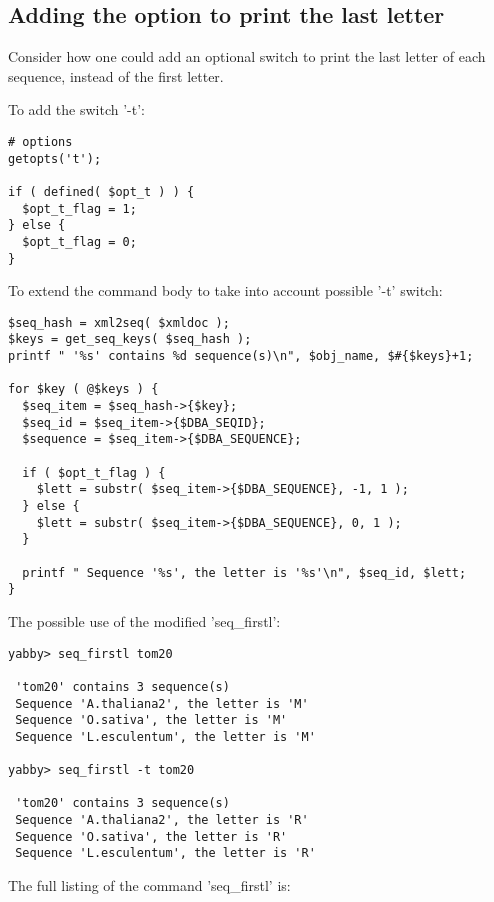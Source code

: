 \subsection{Adding the option to print the last letter}

Consider how one could add an optional switch to print the last
letter of each sequence, instead of the first letter.

To add the switch '-t':

\begin{verbatim}
# options
getopts('t');

if ( defined( $opt_t ) ) {
  $opt_t_flag = 1;
} else {
  $opt_t_flag = 0;
}
\end{verbatim}

To extend the command body to take into account possible '-t'
switch: 

\begin{verbatim}
$seq_hash = xml2seq( $xmldoc );
$keys = get_seq_keys( $seq_hash );
printf " '%s' contains %d sequence(s)\n", $obj_name, $#{$keys}+1;

for $key ( @$keys ) {
  $seq_item = $seq_hash->{$key};
  $seq_id = $seq_item->{$DBA_SEQID};
  $sequence = $seq_item->{$DBA_SEQUENCE};

  if ( $opt_t_flag ) {
    $lett = substr( $seq_item->{$DBA_SEQUENCE}, -1, 1 );
  } else {
    $lett = substr( $seq_item->{$DBA_SEQUENCE}, 0, 1 );
  }

  printf " Sequence '%s', the letter is '%s'\n", $seq_id, $lett;
}
\end{verbatim}

The possible use of the modified 'seq\_firstl':

\begin{verbatim}
yabby> seq_firstl tom20

 'tom20' contains 3 sequence(s)
 Sequence 'A.thaliana2', the letter is 'M'
 Sequence 'O.sativa', the letter is 'M'
 Sequence 'L.esculentum', the letter is 'M'

yabby> seq_firstl -t tom20

 'tom20' contains 3 sequence(s)
 Sequence 'A.thaliana2', the letter is 'R'
 Sequence 'O.sativa', the letter is 'R'
 Sequence 'L.esculentum', the letter is 'R'
\end{verbatim}

The full listing of the command 'seq\_firstl' is:

